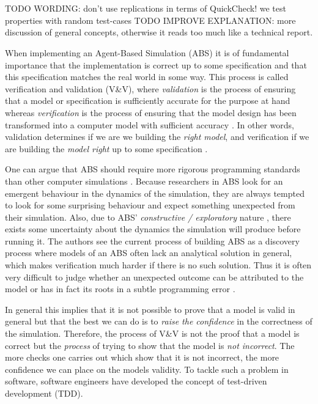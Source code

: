 \chapter*{} %
\label{ch:property}

TODO WORDING: don't use replications in terms of QuickCheck! we test properties with random test-cases
TODO IMPROVE EXPLANATION: more discussion of general concepts, otherwise it reads too much like a technical report.

When implementing an Agent-Based Simulation (ABS) it is of fundamental importance that the implementation is correct up to some specification and that this specification matches the real world in some way. This process is called verification and validation (V\&V), where \textit{validation} is the process of ensuring that a model or specification is sufficiently accurate for the purpose at hand whereas \textit{verification} is the process of ensuring that the model design has been transformed into a computer model with sufficient accuracy \cite{robinson_simulation:_2014}. In other words, validation determines if we are we building the \textit{right model}, and verification if we are building the \textit{model right} up to some specification \cite{balci_verification_1998}.

One can argue that ABS should require more rigorous programming standards than other computer simulations \cite{polhill_ghost_2005}. Because researchers in ABS look for an emergent behaviour in the dynamics of the simulation, they are always tempted to look for some surprising behaviour and expect something unexpected from their simulation. 
Also, due to ABS' \textit{constructive / exploratory} nature \cite{epstein_chapter_2006, epstein_generative_2012}, there exists some uncertainty about the dynamics the simulation will produce before running it. The authors \cite{ormerod_validation_2006} see the current process of building ABS as a discovery process where models of an ABS often lack an analytical solution in general, which makes verification much harder if there is no such solution. Thus it is often very difficult to judge whether an unexpected outcome can be attributed to the model or has in fact its roots in a subtle programming error \cite{galan_errors_2009}.

In general this implies that it is not possible to prove that a model is valid in general but that the best we can do is to \textit{raise the confidence} in the correctness of the simulation. Therefore, the process of V\&V is not the proof that a model is correct but the \textit{process} of trying to show that the model is \textit{not incorrect}. The more checks one carries out which show that it is not incorrect, the more confidence we can place on the models validity. To tackle such a problem in software, software engineers have developed the concept of test-driven development (TDD).

